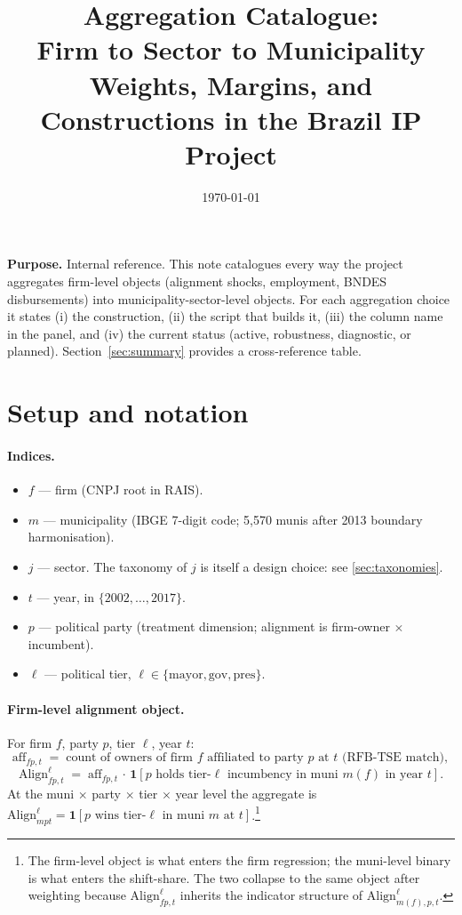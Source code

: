 \documentclass[12pt]{article}
\title{Aggregation Catalogue:\\
Firm to Sector to Municipality\\
\texorpdfstring{\large}{} Weights, Margins, and Constructions in the Brazil IP Project}
\author{}
\date{\today}
\theoremstyle{definition}
\newcommand{\Align}{\mathrm{Align}}
\newcommand{\ind}{\mathbf{1}}
\begin{document}
\maketitle
\thispagestyle{fancy}

\noindent\textbf{Purpose.} Internal reference. This note catalogues every way the project aggregates firm-level objects (alignment shocks, employment, BNDES disbursements) into municipality-sector-level objects. For each aggregation choice it states (i) the construction, (ii) the script that builds it, (iii) the column name in the panel, and (iv) the current status (active, robustness, diagnostic, or planned). Section~\ref{sec:summary} provides a cross-reference table.

\tableofcontents
\bigskip

\section{Setup and notation}
\label{sec:setup}

\paragraph{Indices.}
\begin{itemize}[leftmargin=2em, itemsep=2pt]
\item $f$ --- firm (CNPJ root in RAIS).
\item $m$ --- municipality (IBGE 7-digit code; 5{,}570 munis after 2013 boundary harmonisation).
\item $j$ --- sector. The taxonomy of $j$ is itself a design choice: see \cref{sec:taxonomies}.
\item $t$ --- year, in $\{2002,\dots,2017\}$.
\item $p$ --- political party (treatment dimension; alignment is firm-owner $\times$ incumbent).
\item $\ell$ --- political tier, $\ell \in \{\text{mayor}, \text{gov}, \text{pres}\}$.
\end{itemize}

\paragraph{Firm-level alignment object.}
For firm $f$, party $p$, tier $\ell$, year $t$:
\[
  \mathrm{aff}_{fp,t} \;=\; \text{count of owners of firm $f$ affiliated to party $p$ at $t$ (RFB-TSE match)},
\]
\[
  \Align^{\ell}_{fp,t} \;=\; \mathrm{aff}_{fp,t}\,\cdot\,\ind\!\left[p \text{ holds tier-$\ell$ incumbency in muni $m(f)$ in year $t$}\right].
\]
At the muni $\times$ party $\times$ tier $\times$ year level the aggregate is
$\Align^{\ell}_{m p t} = \ind[p \text{ wins tier-$\ell$ in muni $m$ at $t$}]$.\footnote{The firm-level object is what enters the firm regression; the muni-level binary is what enters the shift-share. The two collapse to the same object after weighting because $\Align^{\ell}_{fp,t}$ inherits the indicator structure of $\Align^{\ell}_{m(f), p, t}$.}
\end{document}
